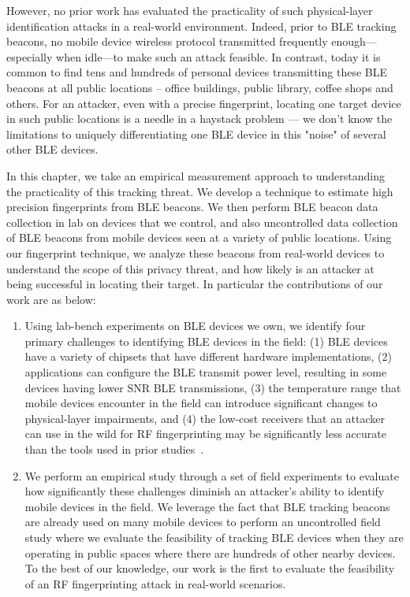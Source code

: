 However, no prior work has evaluated the
practicality of such physical-layer identification attacks in a real-world
environment. 
%
Indeed, prior to BLE tracking beacons, no mobile device wireless
protocol transmitted frequently enough---especially when idle---to make
such an attack feasible. 
%
In contrast, today it is common to find tens and hundreds of personal devices transmitting these BLE beacons at all public locations -- office buildings, public library, coffee shops and others.
%
For an attacker, even with a precise fingerprint, locating one target device in such public locations is a needle in a haystack problem --- we don't know the limitations to uniquely differentiating one BLE device in this "noise" of several other BLE devices.
%

In this chapter, we take an empirical measurement approach to understanding the practicality of this tracking threat. 
%
We develop a technique to estimate high precision fingerprints from BLE beacons.
%
We then perform BLE beacon data collection in lab on devices that we control, and also uncontrolled data collection of BLE beacons from mobile devices seen at a variety of public locations.
%
Using our fingerprint technique, we analyze these beacons from real-world devices to understand the scope of this privacy threat, and how likely is an attacker at being successful in locating their target. 
%
In particular the contributions of our work are as below:

\begin{enumerate}
\item Using lab-bench experiments on BLE devices we own, we identify four primary challenges to identifying BLE devices in the field: (1) BLE devices have a variety of chipsets that have different
hardware implementations, (2) applications can configure the BLE transmit
power level, resulting in some devices having lower SNR BLE transmissions,
(3) the temperature range that mobile devices encounter in the field
can introduce significant changes to physical-layer impairments, and (4) the low-cost
receivers that an attacker can use in the wild for RF fingerprinting may be significantly less accurate than the tools used in prior studies~\cite{Brik_radiometric}.
 
\item We perform an empirical study through a set of field experiments to evaluate how
significantly these challenges diminish an attacker's ability to identify
mobile devices in the field. We leverage the fact that BLE tracking beacons are
already used on many mobile devices to perform an uncontrolled field study
where we evaluate the feasibility of tracking BLE devices when they
are operating in public spaces where there are hundreds of other nearby devices.
 To the best of our knowledge, our work is
the first to evaluate the feasibility of an RF fingerprinting attack in
real-world scenarios.
\end{enumerate}

